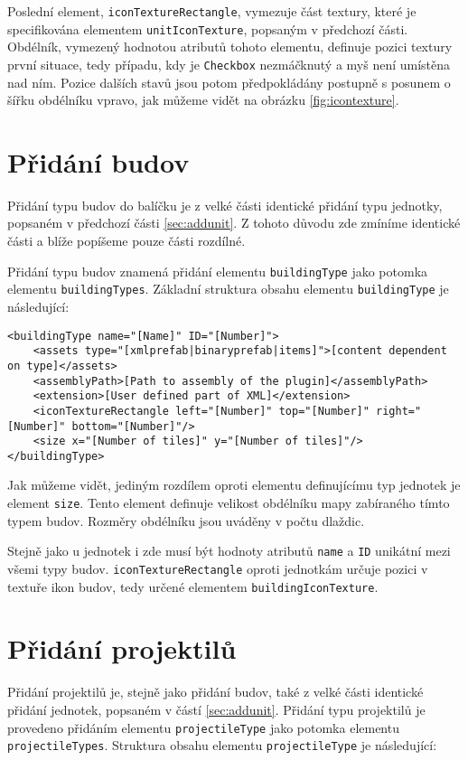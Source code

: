 Poslední element, \texttt{iconTextureRectangle}, vymezuje část textury, které je specifikována elementem \texttt{unitIconTexture}, popsaným v předchozí části. Obdélník, vymezený hodnotou atributů tohoto elementu, definuje pozici textury první situace, tedy případu, kdy je \texttt{Checkbox} nezmáčknutý a myš není umístěna nad ním. Pozice dalších stavů jsou potom předpokládány postupně s posunem o šířku obdélníku vpravo, jak můžeme vidět na obrázku \ref{fig:icontexture}.


\section{Přidání budov}
Přidání typu budov do balíčku je z velké části identické přidání typu jednotky, popsaném v předchozí části \ref{sec:addunit}. Z tohoto důvodu zde zmíníme identické části a blíže popíšeme pouze části rozdílné.

Přidání typu budov znamená přidání elementu \texttt{buildingType} jako potomka elementu \texttt{buildingTypes}. Základní struktura obsahu elementu \texttt{buildingType} je následující:
\begin{lstlisting}
<buildingType name="[Name]" ID="[Number]">
	<assets type="[xmlprefab|binaryprefab|items]">[content dependent on type]</assets>
	<assemblyPath>[Path to assembly of the plugin]</assemblyPath>
	<extension>[User defined part of XML]</extension>
	<iconTextureRectangle left="[Number]" top="[Number]" right="[Number]" bottom="[Number]"/>
	<size x="[Number of tiles]" y="[Number of tiles]"/>
</buildingType>
\end{lstlisting}

Jak můžeme vidět, jediným rozdílem oproti elementu definujícímu typ jednotek je element \texttt{size}. Tento element definuje velikost obdélníku mapy zabíraného tímto typem budov. Rozměry obdélníku jsou uváděny v počtu dlaždic.

Stejně jako u jednotek i zde musí být hodnoty atributů \texttt{name} a \texttt{ID} unikátní mezi všemi typy budov. \texttt{iconTextureRectangle} oproti jednotkám určuje pozici v textuře ikon budov, tedy určené elementem \texttt{buildingIconTexture}.
\section{Přidání projektilů}
Přidání projektilů je, stejně jako přidání budov, také z velké části identické přidání jednotek, popsaném v částí \ref{sec:addunit}. Přidání typu projektilů je provedeno přidáním elementu \texttt{projectileType} jako potomka elementu \texttt{projectileTypes}. Struktura obsahu elementu \texttt{projectileType} je následující:

